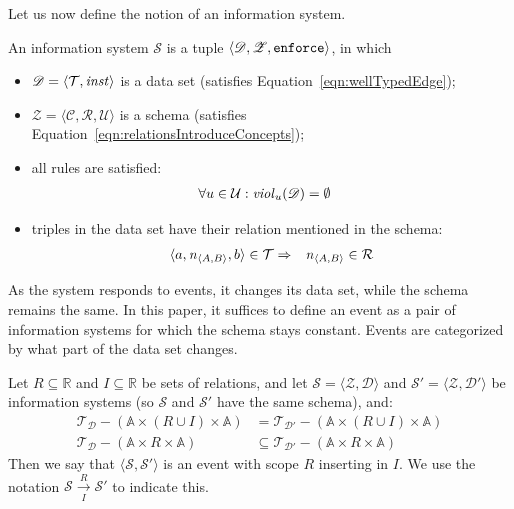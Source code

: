 \documentclass[runningheads]{llncs}
\newcommand{\id}[1]{\text{\it #1\/}}
\newcommand{\enf}{\mathbin{{\tt enforce}}}
\newcommand{\instance}{\mathbin{\id{inst}}}
\newcommand{\viol}[2]{\violC{#1}(#2)}
\newcommand{\violC}[1]{\id{viol}_{#1}}
\newcommand{\declare}[3]{\id{#1}_{\pair{#2}{#3}}}
\newcommand{\pair}[2]{\langle{#1},{#2}\rangle}
\newcommand{\triple}[3]{\langle{#1},{#2},{#3}\rangle}
\newcommand{\Atoms}{\mathbb{A}}
\newcommand{\concepts}{\mathcal{C}}
\newcommand{\rels}{\mathcal{R}}   %
\newcommand{\Rels}{\mathbb{R}}   %
\newcommand{\triples}{\mathcal{T}}
\newcommand{\Triple}[3]{#1\times#2\times#3}
\newcommand{\rules}{\mathcal{U}}
\newcommand{\dataset}{\mathscr{D}}
\newcommand{\schema}{\mathscr{Z}}
\newcommand{\infsys}{\mathscr{S}}
\def\define#1{\label{dfn:#1}{\em #1}\index{#1}}
\begin{document}
   Let us now define the notion of an information system.
\begin{definition}
\label{def:information system}
\item An information system $\infsys$ is a tuple $\triple{\dataset}{\schema}{\enf}$, in which
\begin{itemize}
   \item $\dataset=\pair{\triples}{\instance}$ is a data set (satisfies Equation~\ref{eqn:wellTypedEdge});
   \item $\schema=\triple{\concepts}{\rels}{\rules}$ is a schema (satisfies Equation~\ref{eqn:relationsIntroduceConcepts});
   \item all rules are satisfied:
   \begin{eqnarray}
   \forall u\in\rules&:\viol{u}{\dataset}=\emptyset
   \label{eqn:satisfaction}
   \end{eqnarray}
   \item triples in the data set have their relation mentioned in the schema:
   \begin{eqnarray}
   \triple{a}{\declare{n}{A}{B}}{b}\in\triples&\Rightarrow&\declare{n}{A}{B}\in\rels
   \label{eqn:define R}
   \end{eqnarray}
\end{itemize}
\end{definition}

   As the system responds to events, it changes its data set, while the schema remains the same.
   In this paper, it suffices to define an event as a pair of information systems for which the schema stays constant.
   Events are categorized by what part of the data set changes.
   
   \begin{definition}[Event]
   Let $R \subseteq \Rels$ and $I \subseteq \Rels$ be sets of relations, and let $\infsys = \pair{\schema}{\dataset}$ and $\infsys' = \pair{\schema}{\dataset'}$ be information systems (so $\infsys$ and $\infsys'$ have the same schema), and:
      \begin{align}
      \triples_{\dataset} - (\Triple{\Atoms}{(R \cup I)}{\Atoms}) &= \triples_{\dataset'} - (\Triple{\Atoms}{(R \cup I)}{\Atoms})
   \label{eqn:eventUnchanged}\\
      \triples_{\dataset} - (\Triple{\Atoms}{R}{\Atoms}) &\subseteq \triples_{\dataset'} - (\Triple{\Atoms}{R}{\Atoms})
   \label{eqn:eventInsert}
   \end{align}
   Then we say that $\pair{\infsys}{\infsys'}$ is an event with scope $R$ inserting in $I$.
   We use the notation $\infsys \xrightarrow[I]{R} \infsys'$ to indicate this.
   \end{definition}
   
\end{document}
